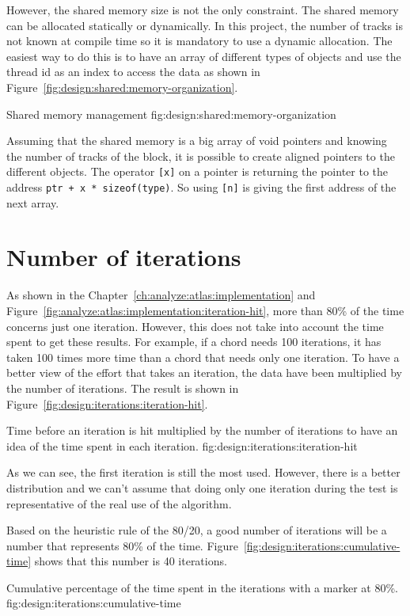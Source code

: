 However, the shared memory size is not the only constraint.
The shared memory can be allocated statically or dynamically.
In this project, the number of tracks is not known at compile time so it is
mandatory to use a dynamic allocation.
The easiest way to do this is to have an array of different types of objects and
use the thread id as an index to access the data as shown in Figure~\ref{fig:design:shared:memory-organization}.

        {Shared memory management}
        {fig:design:shared:memory-organization}

Assuming that the shared memory is a big array of void pointers and knowing the
number of tracks of the block, it is possible to create aligned pointers to the
different objects.
The operator \texttt{[x]} on a pointer is returning the pointer to the address
\texttt{ptr + x * sizeof(type)}. So using \texttt{[n]} is giving the first
address of the next array.


\section{Number of iterations}
\label{ch:design:iterations}

As shown in the Chapter~\ref{ch:analyze:atlas:implementation} and Figure~\ref{fig:analyze:atlas:implementation:iteration-hit},
more than 80\% of the time concerns just one iteration.
However, this does not take into account the time spent to get these results.
For example, if a chord needs 100 iterations, it has taken 100 times more time
than a chord that needs only one iteration.
To have a better view of the effort that takes an iteration, the data have been
multiplied by the number of iterations.
The result is shown in Figure~\ref{fig:design:iterations:iteration-hit}.

        {Time before an iteration is hit multiplied by the number of iterations to
        have an idea of the time spent in each iteration.}
        {fig:design:iterations:iteration-hit}

As we can see, the first iteration is still the most used.
However, there is a better distribution and we can't assume that doing only one
iteration during the test is representative of the real use of the algorithm.

Based on the heuristic rule of the 80/20, a good number of iterations
will be a number that represents 80\% of the time.
Figure~\ref{fig:design:iterations:cumulative-time} shows that this number
is 40 iterations.

        {Cumulative percentage of the time spent in the iterations with a marker
        at 80\%.}
        {fig:design:iterations:cumulative-time}